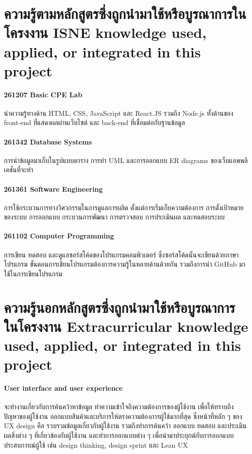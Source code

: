 \section{\ifcpe%
ความรู้ตามหลักสูตรซึ่งถูกนำมาใช้หรือบูรณาการในโครงงาน
\else%
ISNE knowledge used, applied, or integrated in this project
\fi
}
\paragraph{261207 Basic CPE Lab}
นำความรู้ทางด้าน HTML, CSS, JavaScript และ React.JS รวมถึง Node.js 
ทั้งด้านของ front-end ที่แสดงผลผ่านเว็บไซต์ และ back-end ที่เชื่อมต่อกับฐานข้อมูล

\paragraph{261342 Database Systems}
การนำข้อมูลมาเก็บในรูปแบบตาราง การทำ UML และการออกแบบ ER diagrams ของเว็บแอพพลิเคชั่นที่จะทำ

\paragraph{261361 Software Engineering}
การใช้กระบวนการทางวิศวกรรมในการดูแลการผลิต ตั้งแต่การเริ่มเก็บความต้องการ การตั้งเป้าหมายของระบบ 
การออกแบบ กระบวนการพัฒนา การตรวจสอบ การประเมินผล และทดสอบระบบ

\paragraph{261102 Computer Programming}
การเขียน ทดสอบ และดูแลซอร์สโค้ดของโปรแกรมคอมพิวเตอร์ ซึ่งซอร์สโค้ดนั้นจะเขียนด้วยภาษาโปรแกรม 
ขั้นตอนการเขียนโปรแกรมต้องการความรู้ในหลายด้านด้วยกัน รวมถึงการนำ GitHub มาใช้ในการเขียนโปรแกรม

\section{\ifcpe%
ความรู้นอกหลักสูตรซึ่งถูกนำมาใช้หรือบูรณาการในโครงงาน
\else%
Extracurricular knowledge used, applied, or integrated in this project
\fi
}
\paragraph{User interface and user experience}
จะทำงานเกี่ยวกับการค้นคว้าหาข้อมูล ทำความเข้าใจถึงความต้องการของผู้ใช้งาน เพื่อให้ทราบถึงปัญหาของผู้ใช้งาน
ออกแบบสินค้าและบริการให้ตรงความต้องการผู้ใช้มากที่สุด ซึ่งหน้าที่หลัก ๆ ของ UX design คือ 
รวบรวมข้อมูลเกี่ยวกับผู้ใช้งาน รวมถึงทำการค้นคว้า ออกแบบ ทดสอบ และประเมินผลสิ่งต่าง ๆ 
ที่เกี่ยวข้องกับผู้ใช้งาน และทำการออกแบบต่าง ๆ เพื่อนำมาประยุกต์กับการออกแบบประสบการณ์ผู้ใช้
 เช่น design thinking, design sprint และ Lean UX
